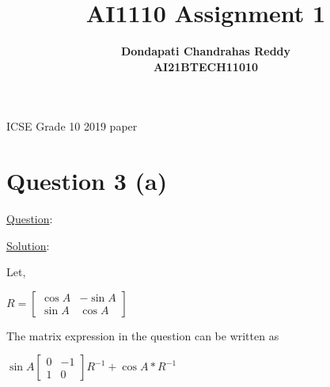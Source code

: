 \documentclass[journal,12pt,twocolumn]{IEEEtran}
\begin{document}
\title{\textbf{AI1110 Assignment 1} }
\author{\textbf{Dondapati Chandrahas Reddy}\\\textbf{AI21BTECH11010}}
\maketitle
\begin{center}
{ ICSE Grade 10 2019 paper}\end{center}\par
{ \section {Question 3 (a) \newline}}
{\Large \underline{Question}:}


\begin{center}
\setlength \fboxrule {0in}
\setlength \fboxsep {0.1in}
\end{center}\par

{\Large \underline{Solution}: \newline\newline }\par
Let,
\begin{center}$R =\left [\begin{array}{cc}\cos A &  -\sin A \\
\sin A & \cos A\end{array}\right ]$\newline\end{center}\par

The matrix expression in the question can be written as

\begin{center}
$\sin A\left [\begin{array}{cc}0 &  -1 \\
1 & 0\end{array}\right ]R^{ -1} +\cos A \ast R^{ -1}$\newline 
\end{center}\par
\end{document}
